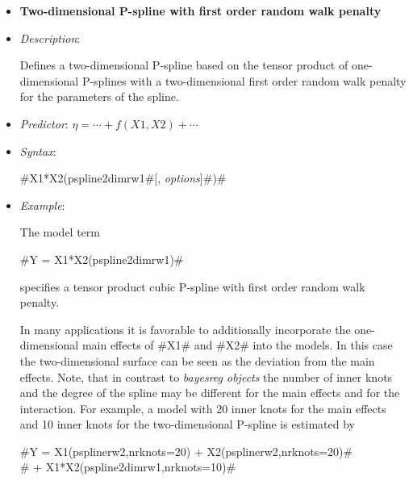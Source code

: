 \begin{itemize}
\item[]{\bf\sffamily Two-dimensional P-spline with first order
random walk penalty}

\item[] {\em Description}:

Defines a two-dimensional P-spline based on the tensor product of
one-dimensional P-splines with a two-dimensional first order
random walk penalty for the parameters of the spline. \item[] {\em
Predictor}: $\eta= \cdots + f(X1,X2) + \cdots$ \item[] {\em
Syntax}:

#X1*X2(pspline2dimrw1#[, {\em options}]#)#
\item[] {\em Example}:

The model term

#Y = X1*X2(pspline2dimrw1)#

specifies a tensor product cubic P-spline with first order random
walk penalty.

In many applications it is favorable to additionally incorporate
the one-dimensional main effects of #X1# and #X2# into the models.
In this case the two-dimensional surface can be seen as the
deviation from the main effects. Note, that in contrast to {\em
bayesreg objects} the number of inner knots and the degree of the
spline may be different for the main effects and for the
interaction. For example, a model with 20 inner knots for the main
effects and 10 inner knots for the two-dimensional P-spline is
estimated by

 #Y = X1(psplinerw2,nrknots=20) + X2(psplinerw2,nrknots=20)#\\
 #    + X1*X2(pspline2dimrw1,nrknots=10)#
\end{itemize}


